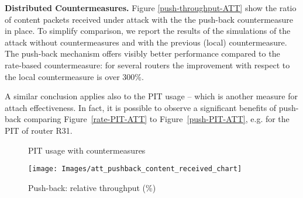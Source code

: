 \documentclass[10pt,conference,letterpaper]{IEEEtran}
\newcommand{\descr}[1]{\medskip\noindent\textbf{#1}}
\renewcommand{\paragraph}{\descr}
\begin{document}
\paragraph{Distributed Countermeasures.} 
Figure \ref{push-throughput-ATT} show the ratio of content packets received under attack with the the push-back countermeasure in place. 
To simplify comparison, we  report the results of the simulations of the attack without countermeasures and with the previous (local) countermeasure.
The push-back mechanism offers visibly better performance compared to the rate-based countermeasure: 
for several routers the improvement with respect to the local countermeasure is over 300\%.

A similar conclusion applies also to the PIT usage -- which is another measure for attach effectiveness.
In fact, 
it is possible to observe a significant benefits of push-back comparing Figure~\ref{rate-PIT-ATT} to Figure~\ref{push-PIT-ATT}, e.g. for the PIT of router R31. 




\begin{comment}
\begin{figure}[ht]
 \centering
{\texttt{[image: Images/att\_PIT\_Chart\_average\_simple]}}
 \caption{Rate-based (local) countermeasure: PIT}
\label{rate-PIT-ATT}
\label{fig:rate-based-count}
 \end{figure}
\end{comment}


\begin{figure*}[htp!]
 \centering
{}
 \hspace{-3mm}
 \caption{PIT usage with countermeasures}
\label{fig:push-back-count}
 \end{figure*}






\begin{figure*}[htp!]
 \centering
{\texttt{[image: Images/att\_pushback\_content\_received\_chart]}} 
 \caption{Push-back: relative throughput (\%)}
\label{push-throughput-ATT}
\label{fig:push-back-count}
 \end{figure*}
\end{document}
